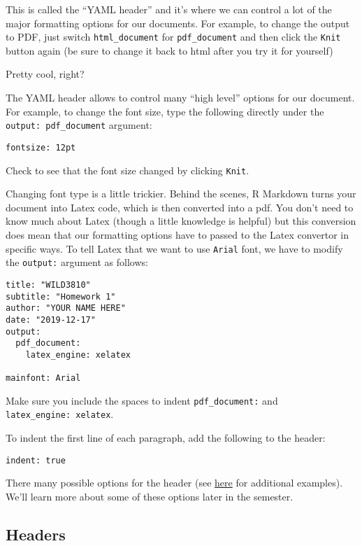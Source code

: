 \documentclass[]{article}
\begin{document}
This is called the ``YAML header'' and it's where we can control a lot
of the major formatting options for our documents. For example, to
change the output to PDF, just switch \texttt{html\_document} for
\texttt{pdf\_document} and then click the \texttt{Knit} button again (be
sure to change it back to html after you try it for yourself)

Pretty cool, right?

The YAML header allows to control many ``high level'' options for our
document. For example, to change the font size, type the following
directly under the \texttt{output:\ pdf\_document} argument:

\begin{verbatim}
fontsize: 12pt
\end{verbatim}

Check to see that the font size changed by clicking \texttt{Knit}.

Changing font type is a little trickier. Behind the scenes, R Markdown
turns your document into Latex code, which is then converted into a pdf.
You don't need to know much about Latex (though a little knowledge is
helpful) but this conversion does mean that our formatting options have
to passed to the Latex convertor in specific ways. To tell Latex that we
want to use \texttt{Arial} font, we have to modify the \texttt{output:}
argument as follows:

\begin{verbatim}
title: "WILD3810"
subtitle: "Homework 1"
author: "YOUR NAME HERE"
date: "2019-12-17"
output: 
  pdf_document:
    latex_engine: xelatex

mainfont: Arial
\end{verbatim}

Make sure you include the spaces to indent \texttt{pdf\_document:} and
\texttt{latex\_engine:\ xelatex}.

To indent the first line of each paragraph, add the following to the
header:

\begin{verbatim}
indent: true
\end{verbatim}

There many possible options for the header (see
\href{https://www.rstudio.com/wp-content/uploads/2016/03/rmarkdown-cheatsheet-2.0.pdf}{here}
for additional examples). We'll learn more about some of these options
later in the semester.

\hypertarget{headers}{%
\subsection{Headers}\label{headers}}
\end{document}
